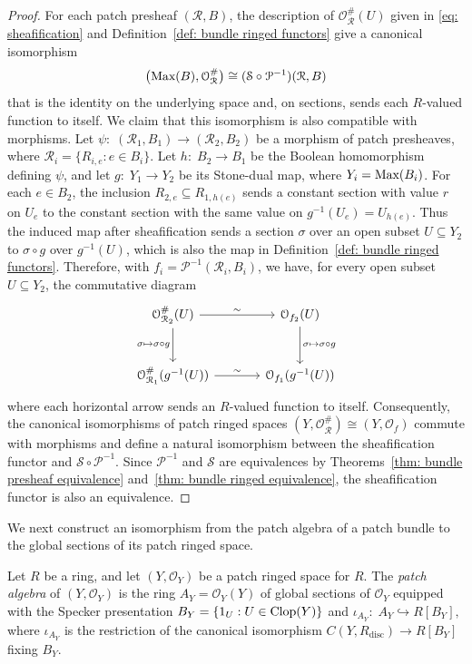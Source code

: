 \documentclass[11pt]{amsart}
\def\O{{\mathcal{O}}}
\begin{document}
\begin{proof}
For each patch presheaf $(\mathcal R,B)$, the description of \(\mathcal O_{\mathcal R}^{\#}(U)\) given in \eqref{eq: sheafification} and Definition~\ref{def: bundle ringed functors} give a canonical isomorphism
$$
\bigl(\mbox{\rm Max}(B),\mathcal O_{\mathcal R}^{\#}\bigr)
\cong (\mathcal S\circ\mathcal P^{-1})(\mathcal R,B)
$$
that  is the identity on the underlying space and, on sections, sends each $R$-valued function to itself. 
We claim that this isomorphism is also compatible with morphisms.
Let $\psi\colon\; (\mathcal R_1,B_1)\to(\mathcal R_2,B_2)$ be a morphism of patch presheaves, where $\mathcal R_i=\{R_{i,e}:e\in B_i\}$. Let $h\colon\; B_2\to B_1$ be the Boolean homomorphism defining $\psi$, and let $g\colon\; Y_1\to Y_2$ be its Stone-dual map, where $Y_i=\mbox{\rm Max}(B_i)$. For each $e\in B_2$, the inclusion $R_{2,e}\subseteq R_{1,h(e)}$ sends a constant section with value $r$ on $U_e$ to the constant section with the same value on $g^{-1}(U_e)=U_{h(e)}$. Thus the induced map after sheafification sends a section $\sigma$ over an open subset $U\subseteq Y_2$ to $\sigma\circ g$ over $g^{-1}(U)$, which is also the map in Definition~\ref{def: bundle ringed functors}.
Therefore, with  $f_i=\mathcal P^{-1}(\mathcal R_i,B_i)$, we  have, for every open subset $U\subseteq Y_2$, the commutative diagram
$$
\begin{tikzcd}[column sep=large, row sep=large]
\mathcal O_{\mathcal R_2}^{\#}(U)
  \arrow[r, "\sim"] \arrow[d, "{\sigma\mapsto\sigma\circ g}"']
& \mathcal O_{f_2}(U)
  \arrow[d, "{\sigma\mapsto\sigma\circ g}"] \\
\mathcal O_{\mathcal R_1}^{\#}(g^{-1}(U))
  \arrow[r, "\sim"]
& \mathcal O_{f_1}(g^{-1}(U))
\end{tikzcd}
$$
where each horizontal arrow sends an $R$-valued function to itself.
Consequently, the canonical isomorphisms of patch ringed spaces $(Y,\mathcal O_{\mathcal R}^{\#})\cong(Y,\mathcal O_f)$  commute with morphisms and define a natural isomorphism between the sheafification functor and $\mathcal S\circ\mathcal P^{-1}$. Since $\mathcal P^{-1}$ and $\mathcal S$ are equivalences by Theorems~\ref{thm: bundle presheaf equivalence} and~\ref{thm: bundle ringed equivalence}, the  sheafification functor is also an equivalence.
\end{proof}

We next construct an isomorphism from the  patch algebra of a patch bundle to  the global sections of its patch ringed space.
\begin{definition}\label{lem: global section algebra}
Let $R$ be a ring, and let $(Y,\mathcal O_Y)$ be a patch ringed space for $R$.
The {\it patch algebra} of $(Y,\mathcal O_Y)$ is the ring $A_Y=\O_Y(Y)$ of global sections of $\O_Y$  equipped with the Specker presentation
$
B_Y=\{1_U:U\in\mbox{\rm Clop}(Y)\} $ and $
\iota_{A_Y}\colon\; A_Y\hookrightarrow R[B_Y],
$
where $\iota_{A_Y}$ is the restriction of the canonical isomorphism $C(Y,R_{\mathrm{disc}})\to R[B_Y]$ fixing $B_Y$.
\end{definition}
\end{document}
